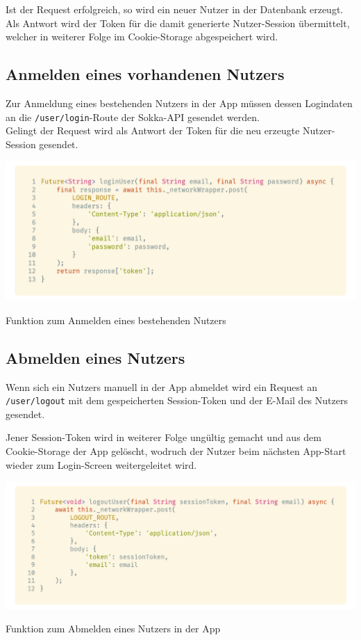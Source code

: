 \newpage

Ist der Request erfolgreich, so wird ein neuer Nutzer in der Datenbank erzeugt. Als Antwort wird der
Token für die damit generierte Nutzer-Session übermittelt, welcher in weiterer Folge im Cookie-Storage
abgespeichert wird.

\subsection{Anmelden eines vorhandenen Nutzers}

Zur Anmeldung eines bestehenden Nutzers in der App müssen dessen Logindaten an die 
\lstinline{/user/login}-Route der Sokka-API gesendet werden.\\
Gelingt der Request wird als Antwort der Token für die neu erzeugte Nutzer-Session gesendet.

\begin{code}
    \centering
    \includegraphics[width=1\textwidth]{images/Client/services/user-auth/login.png}
    \vspace{-25pt}
    \caption{Funktion zum Anmelden eines bestehenden Nutzers}
\end{code}

\subsection{Abmelden eines Nutzers}

Wenn sich ein Nutzers manuell in der App abmeldet wird ein Request an \lstinline{/user/logout} mit
dem gespeicherten Session-Token und der E-Mail des Nutzers gesendet.

Jener Session-Token wird in weiterer Folge ungültig gemacht und aus dem Cookie-Storage der App
gelöscht, wodruch der Nutzer beim nächsten App-Start wieder zum Login-Screen weitergeleitet wird.

\begin{code}
    \centering
    \includegraphics[width=1\textwidth]{images/Client/services/user-auth/logout.png}
    \vspace{-25pt}
    \caption{Funktion zum Abmelden eines Nutzers in der App}
\end{code}

